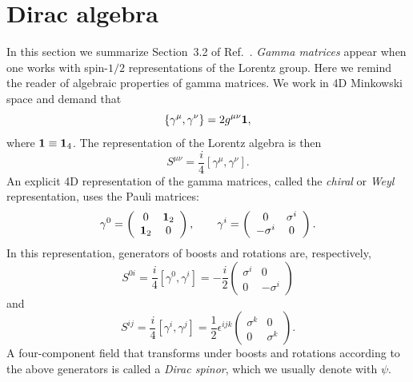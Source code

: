 
\section{Dirac algebra}
In this section we summarize Section~3.2 of 
Ref.~\cite{peskin_introduction_1995}.
{\it Gamma matrices} appear when one works with spin-$1/2$ representations of
the Lorentz group. Here we remind the reader of algebraic properties of gamma
matrices. We work in 4D Minkowski space and demand that
\begin{equation}
  \left\{\gamma^\mu,\gamma^\nu\right\}=2g^{\mu\nu}{\mathbf 1},
\end{equation}
where ${\mathbf 1}\equiv{\mathbf 1}_4$. The representation of the Lorentz algebra is then
\begin{equation}
  S^{\mu\nu}=\frac{i}{4}\left[\gamma^\mu,\gamma^\nu\right].
\end{equation}
An explicit 4D representation of the gamma matrices, called the {\it chiral} 
or {\it Weyl} representation, uses the Pauli matrices:
\begin{equation}
  \gamma^0=\left(\begin{array}{cc}
                 0      & {\mathbf 1}_2    \\
                 {\mathbf 1}_2  & 0
           \end{array}\right), \qquad
  \gamma^i=\left(\begin{array}{cc}
                 0         & \sigma^i \\
                 -\sigma^i & 0
           \end{array}\right).
\end{equation}
In this representation, generators of boosts and rotations are, respectively,
\begin{equation}
  S^{0i}=\frac{i}{4}\left[\gamma^0,\gamma^i\right]
        =-\frac{i}{2}
         \left(\begin{array}{cc}
           \sigma^i & 0        \\
           0        & -\sigma^i
         \end{array}\right)
\end{equation}
and
\begin{equation}
  S^{ij}=\frac{i}{4}\left[\gamma^i,\gamma^j\right]
        =\frac{1}{2}\epsilon^{ijk}
         \left(\begin{array}{cc}
           \sigma^k & 0        \\
           0        & \sigma^k
         \end{array}\right).
\end{equation}
A four-component field that transforms under boosts and rotations according to
the above generators is called a {\it Dirac spinor}, which we usually denote
with $\psi$. 

